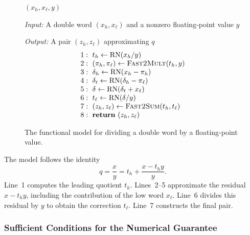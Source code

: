 \begin{figure}[t]
  \centering
  \begingroup
  \setlength{\fboxsep}{6pt}
  \colorbox{gray!3}{%
    \begin{minipage}[t]{\dimexpr\linewidth-2\fboxsep\relax}
      \centering
      \textbf{\DWDivFP{}$(x_h,x_\ell,y)$}
      \par\smallskip
      \raggedright\small
      \textit{Input:} A double word $(x_h,x_\ell)$ and a nonzero
      floating-point value $y$\par
      \textit{Output:} A pair $(z_h,z_\ell)$ approximating $q$
      \setlength{\abovedisplayskip}{4pt}
      \setlength{\belowdisplayskip}{0pt}
      \[
        \begin{array}{@{}r@{\hspace{0.6em}}l@{}}
          1: & t_h \leftarrow \operatorname{RN}(x_h/y)\\
          2: & (\pi_h,\pi_\ell) \leftarrow \FastTwoMult{}(t_h,y)\\
          3: & \delta_h \leftarrow \operatorname{RN}(x_h-\pi_h)\\
          4: & \delta_t \leftarrow \operatorname{RN}(\delta_h-\pi_\ell)\\
          5: & \delta \leftarrow \operatorname{RN}(\delta_t+x_\ell)\\
          6: & t_\ell \leftarrow \operatorname{RN}(\delta/y)\\
          7: & (z_h,z_\ell) \leftarrow \FastTwoSum{}(t_h,t_\ell)\\
          8: & \mathbf{return}\ (z_h,z_\ell)
        \end{array}
      \]
    \end{minipage}}
  \endgroup
  \caption{The functional model \DWDivFP{} for dividing a double word by a
  floating-point value.}
  \label{alg:dw-div-fp}
\end{figure}

The model follows the identity
\[
  q=\frac{x}{y}
    =t_h+\frac{x-t_hy}{y}.
\]
Line~1 computes the leading quotient $t_h$.
Lines~2--5 approximate the residual $x-t_hy$, including the contribution of
the low word $x_\ell$. Line~6 divides this residual by $y$ to obtain the
correction $t_\ell$. Line~7 constructs the final pair.

\subsubsection{Sufficient Conditions for the Numerical Guarantee}
\label{sec:division-conditions}


